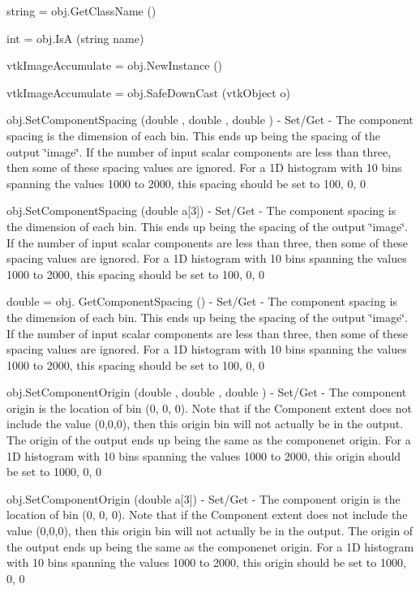 \begin{DoxyItemize}
\item {\ttfamily string = obj.\-Get\-Class\-Name ()}  
\item {\ttfamily int = obj.\-Is\-A (string name)}  
\item {\ttfamily vtk\-Image\-Accumulate = obj.\-New\-Instance ()}  
\item {\ttfamily vtk\-Image\-Accumulate = obj.\-Safe\-Down\-Cast (vtk\-Object o)}  
\item {\ttfamily obj.\-Set\-Component\-Spacing (double , double , double )} -\/ Set/\-Get -\/ The component spacing is the dimension of each bin. This ends up being the spacing of the output \char`\"{}image\char`\"{}. If the number of input scalar components are less than three, then some of these spacing values are ignored. For a 1\-D histogram with 10 bins spanning the values 1000 to 2000, this spacing should be set to 100, 0, 0  
\item {\ttfamily obj.\-Set\-Component\-Spacing (double a\mbox{[}3\mbox{]})} -\/ Set/\-Get -\/ The component spacing is the dimension of each bin. This ends up being the spacing of the output \char`\"{}image\char`\"{}. If the number of input scalar components are less than three, then some of these spacing values are ignored. For a 1\-D histogram with 10 bins spanning the values 1000 to 2000, this spacing should be set to 100, 0, 0  
\item {\ttfamily double = obj. Get\-Component\-Spacing ()} -\/ Set/\-Get -\/ The component spacing is the dimension of each bin. This ends up being the spacing of the output \char`\"{}image\char`\"{}. If the number of input scalar components are less than three, then some of these spacing values are ignored. For a 1\-D histogram with 10 bins spanning the values 1000 to 2000, this spacing should be set to 100, 0, 0  
\item {\ttfamily obj.\-Set\-Component\-Origin (double , double , double )} -\/ Set/\-Get -\/ The component origin is the location of bin (0, 0, 0). Note that if the Component extent does not include the value (0,0,0), then this origin bin will not actually be in the output. The origin of the output ends up being the same as the componenet origin. For a 1\-D histogram with 10 bins spanning the values 1000 to 2000, this origin should be set to 1000, 0, 0  
\item {\ttfamily obj.\-Set\-Component\-Origin (double a\mbox{[}3\mbox{]})} -\/ Set/\-Get -\/ The component origin is the location of bin (0, 0, 0). Note that if the Component extent does not include the value (0,0,0), then this origin bin will not actually be in the output. The origin of the output ends up being the same as the componenet origin. For a 1\-D histogram with 10 bins spanning the values 1000 to 2000, this origin should be set to 1000, 0, 0  

\end{DoxyItemize}
